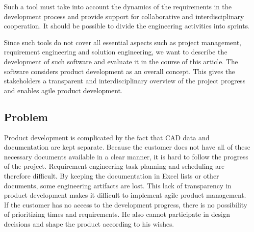     Such a tool must take into account the dynamics of the requirements in the development process and provide support for collaborative and interdisciplinary cooperation. It should be possible to divide the engineering activities into sprints.

    Since such tools do not cover all essential aspects such as project management, requirement engineering and solution engineering, we want to describe the development of such software and evaluate it in the course of this article. The software considers product development as an overall concept. This gives the stakeholders a transparent and interdisciplinary overview of the project progress and enables agile product development.
    






    \subsection*{Problem}
    Product development is complicated by the fact that CAD data and documentation are kept separate. Because the customer does not have all of these necessary documents available in a clear manner, it is hard to follow the progress of the project. Requirement engineering task planning and scheduling are therefore difficult. By keeping the documentation in Excel lists or other documents, some engineering artifacts are lost. This lack of transparency in product development makes it difficult to implement agile product management. If the customer has no access to the development progress, there is no possibility of prioritizing times and requirements. He also cannot participate in design decisions and shape the product according to his wishes.

